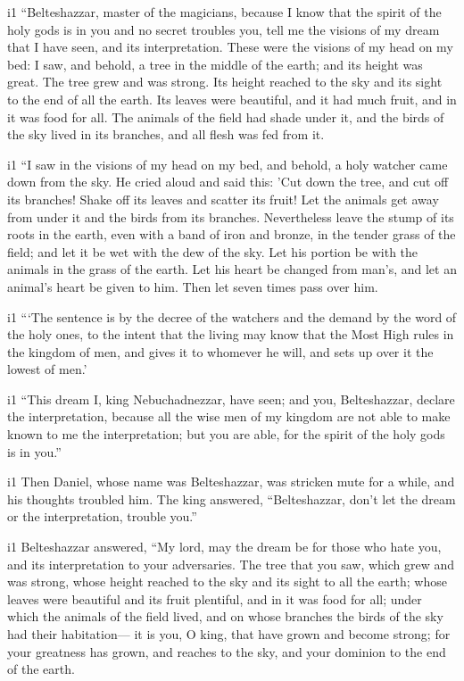 i1 ``Belteshazzar, master of the magicians, because I know
that the spirit of the holy gods is in you and no secret troubles you,
tell me the visions of my dream that I have seen, and its
interpretation.  These were the visions of my head on my
bed: I saw, and behold, a tree in the middle of the earth; and its
height was great.  The tree grew and was strong. Its height
reached to the sky and its sight to the end of all the earth.
 Its leaves were beautiful, and it had much fruit, and in
it was food for all. The animals of the field had shade under it, and
the birds of the sky lived in its branches, and all flesh was fed from
it.

i1 ``I saw in the visions of my head on my bed, and behold,
a holy watcher came down from the sky.  He cried aloud and
said this: 'Cut down the tree, and cut off its branches! Shake off its
leaves and scatter its fruit! Let the animals get away from under it and
the birds from its branches.  Nevertheless leave the stump
of its roots in the earth, even with a band of iron and bronze, in the
tender grass of the field; and let it be wet with the dew of the sky.
Let his portion be with the animals in the grass of the earth.
 Let his heart be changed from man's, and let an animal's
heart be given to him. Then let seven times pass over him.

i1 ```The sentence is by the decree of the watchers and the
demand by the word of the holy ones, to the intent that the living may
know that the Most High rules in the kingdom of men, and gives it to
whomever he will, and sets up over it the lowest of men.'

i1 ``This dream I, king Nebuchadnezzar, have seen; and you,
Belteshazzar, declare the interpretation, because all the wise men of my
kingdom are not able to make known to me the interpretation; but you are
able, for the spirit of the holy gods is in you.''

i1 Then Daniel, whose name was Belteshazzar, was stricken
mute for a while, and his thoughts troubled him. The king answered,
``Belteshazzar, don't let the dream or the interpretation, trouble
you.''

i1 Belteshazzar answered, ``My lord, may the dream be for those who hate
you, and its interpretation to your adversaries.  The tree
that you saw, which grew and was strong, whose height reached to the sky
and its sight to all the earth;  whose leaves were
beautiful and its fruit plentiful, and in it was food for all; under
which the animals of the field lived, and on whose branches the birds of
the sky had their habitation---  it is you, O king, that
have grown and become strong; for your greatness has grown, and reaches
to the sky, and your dominion to the end of the earth.

